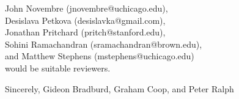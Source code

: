 \documentclass[11pt]{letter}
\begin{document}
John Novembre (jnovembre@uchicago.edu), \\
Desislava Petkova (desislavka@gmail.com), \\
Jonathan Pritchard (pritch@stanford.edu),  \\
Sohini Ramachandran (sramachandran@brown.edu), \\
and Matthew Stephens (mstephens@uchicago.edu) \\
would be suitable reviewers. 

Sincerely,
Gideon Bradburd, 
Graham Coop, and 
Peter Ralph
\end{document}
